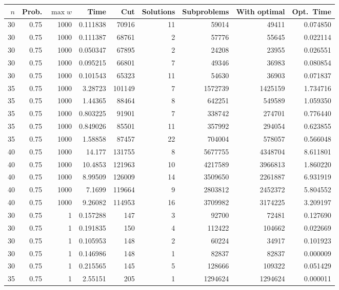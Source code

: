 \documentclass[a4paper,11pt]{article}
\begin{document}
\begin{table}
\begin{center}
\begin{tabular}{|rrr|r|r|rrr|r|}
\hline
$n$ & Prob. & $\max w$ & Time & Cut & Solutions & Subproblems & With
optimal & Opt.\ Time \\
\hline
30 & 0.75 & 1000 & 0.111838 & 70916 & 11 & 59014 & 49411 & 0.074850 \\
30 & 0.75 & 1000 & 0.111387 & 68761 & 2 & 57776 & 55645 & 0.022114 \\
30 & 0.75 & 1000 & 0.050347 & 67895 & 2 & 24208 & 23955 & 0.026551 \\
30 & 0.75 & 1000 & 0.095215 & 66801 & 7 & 49346 & 36983 & 0.080854 \\
30 & 0.75 & 1000 & 0.101543 & 65323 & 11 & 54630 & 36903 & 0.071837 \\
35 & 0.75 & 1000 & 3.28723 & 101149 & 7 & 1572739 & 1425159 & 1.734716 \\
35 & 0.75 & 1000 & 1.44365 & 88464 & 8 & 642251 & 549589 & 1.059350 \\
35 & 0.75 & 1000 & 0.803225 & 91901 & 7 & 338742 & 274701 & 0.776440 \\
35 & 0.75 & 1000 & 0.849026 & 85501 & 11 & 357992 & 294054 & 0.623855 \\
35 & 0.75 & 1000 & 1.58858 & 87457 & 22 & 704004 & 578057 & 0.566048 \\
40 & 0.75 & 1000 & 14.177 & 131755 & 8 & 5677755 & 4348704 & 8.611801 \\
40 & 0.75 & 1000 & 10.4853 & 121963 & 10 & 4217589 & 3966813 & 1.860220 \\
40 & 0.75 & 1000 & 8.99509 & 126009 & 14 & 3509650 & 2261887 & 6.931919 \\
40 & 0.75 & 1000 & 7.1699 & 119664 & 9 & 2803812 & 2452372 & 5.804552 \\
40 & 0.75 & 1000 & 9.26082 & 114953 & 16 & 3709982 & 3174225 & 3.209197 \\
\hline
30 & 0.75 & 1 & 0.157288 & 147 & 3 & 92700 & 72481 & 0.127690 \\
30 & 0.75 & 1 & 0.191835 & 150 & 4 & 112422 & 104662 & 0.022669 \\
30 & 0.75 & 1 & 0.105953 & 148 & 2 & 60224 & 34917 & 0.101923 \\
30 & 0.75 & 1 & 0.146986 & 148 & 1 & 82837 & 82837 & 0.000009 \\
30 & 0.75 & 1 & 0.215565 & 145 & 5 & 128666 & 109322 & 0.051429 \\
35 & 0.75 & 1 & 2.55151 & 205 & 1 & 1294624 & 1294624 & 0.000011 \\

\end{tabular}
\end{center}
\end{table}
\end{document}
